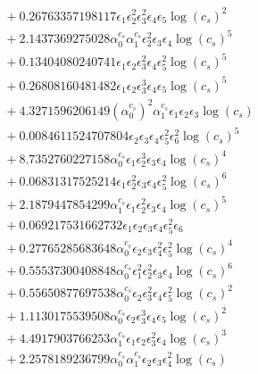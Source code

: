 \documentclass[10pt]{article}
\begin{document}
\begin{align*}
&{}  + 0.26763357198117 \epsilon_{1} \epsilon_{2}^{2} \epsilon_{3}^{2} \epsilon_{4} \epsilon_{5} \log{\left(c_{s} \right)}^{2} \\
&{}  + 2.1437369275028 \alpha_{0}^{c_s} \alpha_{1}^{c_s} \epsilon_{2}^{2} \epsilon_{3} \epsilon_{4} \log{\left(c_{s} \right)}^{5} \\
&{}  + 0.13404080240741 \epsilon_{1} \epsilon_{2} \epsilon_{3}^{2} \epsilon_{4} \epsilon_{5}^{2} \log{\left(c_{s} \right)}^{5} \\
&{}  + 0.26808160481482 \epsilon_{1} \epsilon_{2} \epsilon_{3}^{3} \epsilon_{4} \epsilon_{5} \log{\left(c_{s} \right)}^{5} \\
&{}  + 4.3271596206149 \left(\alpha_{0}^{c_s}\right)^{2} \alpha_{1}^{c_s} \epsilon_{1} \epsilon_{2} \epsilon_{3} \log{\left(c_{s} \right)} \\
&{}  + 0.0084611524707804 \epsilon_{2} \epsilon_{3} \epsilon_{4} \epsilon_{5}^{2} \epsilon_{6}^{2} \log{\left(c_{s} \right)}^{5} \\
&{}  + 8.7352760227158 \alpha_{0}^{c_s} \epsilon_{1} \epsilon_{2}^{3} \epsilon_{3} \epsilon_{4} \log{\left(c_{s} \right)}^{4} \\
&{}  + 0.06831317525214 \epsilon_{1} \epsilon_{2}^{2} \epsilon_{3} \epsilon_{4} \epsilon_{5}^{2} \log{\left(c_{s} \right)}^{6} \\
&{}  + 2.1879447854299 \alpha_{1}^{c_s} \epsilon_{1} \epsilon_{2}^{2} \epsilon_{3} \epsilon_{4} \log{\left(c_{s} \right)}^{5} \\
&{}  + 0.069217531662732 \epsilon_{1} \epsilon_{2} \epsilon_{3} \epsilon_{4} \epsilon_{5}^{2} \epsilon_{6} \\
&{}  + 0.27765285683648 \alpha_{0}^{c_s} \epsilon_{2} \epsilon_{3} \epsilon_{4}^{2} \epsilon_{5}^{2} \log{\left(c_{s} \right)}^{4} \\
&{}  + 0.55537300408848 \alpha_{0}^{c_s} \epsilon_{1}^{2} \epsilon_{2}^{2} \epsilon_{3} \epsilon_{4} \log{\left(c_{s} \right)}^{6} \\
&{}  + 0.55650877697538 \alpha_{0}^{c_s} \epsilon_{2} \epsilon_{3}^{2} \epsilon_{4} \epsilon_{5}^{2} \log{\left(c_{s} \right)}^{2} \\
&{}  + 1.1130175539508 \alpha_{0}^{c_s} \epsilon_{2} \epsilon_{3}^{3} \epsilon_{4} \epsilon_{5} \log{\left(c_{s} \right)}^{2} \\
&{}  + 4.4917903766253 \alpha_{1}^{c_s} \epsilon_{1} \epsilon_{2} \epsilon_{3}^{2} \epsilon_{4} \log{\left(c_{s} \right)}^{3} \\
&{}  + 2.2578189236799 \alpha_{0}^{c_s} \alpha_{1}^{c_s} \epsilon_{2} \epsilon_{3} \epsilon_{4}^{2} \log{\left(c_{s} \right)} \\

\end{align*}
\end{document}
